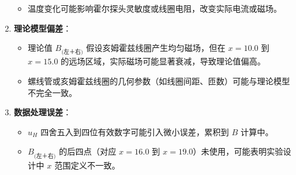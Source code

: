 \documentclass[12pt]{article}
\begin{document}
\begin{CJK}{UTF8}{gbsn}
\begin{enumerate}
\begin{itemize}
            \item 温度变化可能影响霍尔探头灵敏度或线圈电阻，改变实际电流或磁场。
        \end{itemize}
    \item \textbf{理论模型偏差}：
        \begin{itemize}
            \item 理论值 \( B_{\text{(左＋右)}} \) 假设亥姆霍兹线圈产生均匀磁场，但在 \( x = 10.0 \) 到 \( x = 15.0 \) 的远场区域，实际磁场可能显著衰减，导致理论值偏高。
            \item 螺线管或亥姆霍兹线圈的几何参数（如线圈间距、匝数）可能与理论模型不完全一致。
        \end{itemize}
    \item \textbf{数据处理误差}：
        \begin{itemize}
            \item \( u_H \) 四舍五入到四位有效数字可能引入微小误差，累积到 \( B \) 计算中。
            \item \( B_{\text{(左＋右)}} \) 的后四点（对应 \( x = 16.0 \) 到 \( x = 19.0 \)）未使用，可能表明实验设计中 \( x \) 范围定义不一致。
        \end{itemize}
\end{enumerate}


\end{CJK}
\end{document}
